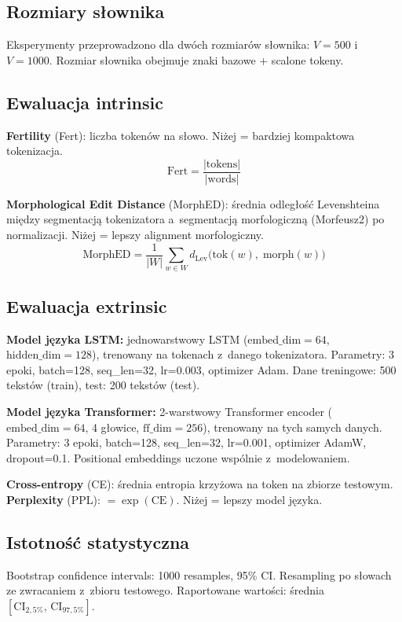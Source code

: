 \subsection*{Rozmiary słownika}
Eksperymenty przeprowadzono dla dwóch rozmiarów słownika:
$V = 500$ i~$V = 1000$.
Rozmiar słownika obejmuje znaki bazowe + scalone tokeny.

\subsection*{Ewaluacja intrinsic}
\label{sec:intrinsic}
\textbf{Fertility} (Fert): liczba tokenów na słowo.
Niżej = bardziej kompaktowa tokenizacja.
\[
  \mathrm{Fert} = \frac{|\mathrm{tokens}|}{|\mathrm{words}|}
\]

\textbf{Morphological Edit Distance} (MorphED): średnia odległość
Levenshteina między segmentacją tokenizatora a~segmentacją
morfologiczną (Morfeusz2) po normalizacji.
Niżej = lepszy alignment morfologiczny.
\[
  \mathrm{MorphED} = \frac{1}{|W|} \sum_{w \in W}
    d_{\mathrm{Lev}}\!\bigl(\mathrm{tok}(w),\; \mathrm{morph}(w)\bigr)
\]

\subsection*{Ewaluacja extrinsic}
\label{sec:extrinsic}
\textbf{Model języka LSTM:} jednowarstwowy LSTM
($\mathrm{embed\_dim}=64$, $\mathrm{hidden\_dim}=128$),
trenowany na tokenach z~danego tokenizatora.
Parametry: 3 epoki, batch=128, seq\_len=32, lr=0.003, optimizer Adam.
Dane treningowe: 500 tekstów (train), test: 200 tekstów (test).

\smallskip
\noindent
\textbf{Model języka Transformer:} 2-warstwowy Transformer encoder
($\mathrm{embed\_dim}=64$, 4 głowice, $\mathrm{ff\_dim}=256$),
trenowany na tych samych danych. Parametry: 3 epoki, batch=128,
seq\_len=32, lr=0.001, optimizer AdamW, dropout=0.1.
Positional embeddings uczone wspólnie z~modelowaniem.

\textbf{Cross-entropy} (CE): średnia entropia krzyżowa na token
na zbiorze testowym.
\textbf{Perplexity} (PPL): $= \exp(\mathrm{CE})$.
Niżej = lepszy model języka.

\subsection*{Istotność statystyczna}
Bootstrap confidence intervals: 1000 resamples, 95\% CI.
Resampling po słowach ze zwracaniem z~zbioru testowego.
Raportowane wartości: średnia $[\mathrm{CI}_{2{,}5\%},\, \mathrm{CI}_{97{,}5\%}]$.

